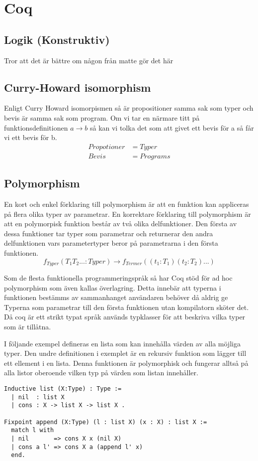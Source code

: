 \section{Coq}

\subsection{Logik (Konstruktiv)}
Tror att det är bättre om någon från matte gör det här

\subsection{Curry-Howard isomorphism}
Enligt Curry Howard isomorpismen så är propositioner samma sak som typer och
bevis är samma sak som program. Om vi tar en närmare titt på
funktionsdefinitionen $a \rightarrow b$ så kan vi tolka det som att givet ett
bevis för a så får vi ett bevis för b.
\begin{align*}
  Propotioner &= Typer \\
  Bevis       &= Programs
\end{align*}

\subsection{Polymorphism}
En kort och enkel förklaring till polymorphism är att en funktion kan appliceras
på flera olika typer av parametrar.
En korrektare förklaring till polymorphism är att en polymorpisk funktion
består av två olika delfunktioner. Den första av dessa funktioner tar
typer som parametrar och returnerar den andra delfunktionen vars parametertyper
beror på parametrarna i den första funktionen.
\begin{equation}
f_{Typer}(T_1 T_2 ... : Typer)
\rightarrow f_{Termer}((t_1 : T_1) (t_2 : T_2) ...)
\end{equation}


Som de flesta funktionella programmeringspråk så har Coq stöd för ad hoc
polymorphism som även kallas överlagring. Detta innebär att typerna i
funktionen bestämms av sammanhanget användaren behöver då aldrig ge
Typerna som parametrar till den första funktionen utan kompilatorn sköter
det.
Då coq är ett strikt typat språk används
typklasser för att beskriva vilka typer som är tillåtna.

I följande exempel defineras en lista som kan innehålla värden av alla möjliga
typer. Den undre definitionen i exemplet är en rekursiv funktion som lägger till
ett ellement i en lista. Denna funktionen är polymorphisk och fungerar alltså på
alla listor oberoende vilken typ på värden som listan innehåller.
\begin{lstlisting}
Inductive list (X:Type) : Type :=
  | nil  : list X
  | cons : X -> list X -> list X .

Fixpoint append (X:Type) (l : list X) (x : X) : list X :=
  match l with
  | nil       => cons X x (nil X)
  | cons a l' => cons X a (append l' x)
  end.
\end{lstlisting}

